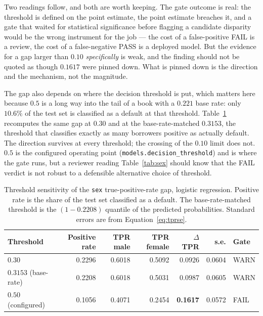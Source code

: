 \documentclass[10pt,a4paper]{article}
\newcommand{\code}[1]{\texttt{\small #1}}
\begin{document}
Two readings follow, and both are worth keeping. The gate outcome is real: the
threshold is defined on the point estimate, the point estimate breaches it, and a
gate that waited for statistical significance before flagging a candidate
disparity would be the wrong instrument for the job --- the cost of a
false-positive FAIL is a review, the cost of a false-negative PASS is a deployed
model. But the evidence for a gap larger than $0.10$ \emph{specifically} is weak,
and the finding should not be quoted as though $0.1617$ were pinned down. What is
pinned down is the direction and the mechanism, not the magnitude.

The gap also depends on where the decision threshold is put, which matters here
because $0.5$ is a long way into the tail of a book with a $0.221$ base rate: only
$10.6\%$ of the test set is classified as a default at that threshold.
Table~\ref{tab:thresholds} recomputes the same gap at $0.30$ and at the
base-rate-matched $0.3153$, the threshold that classifies exactly as many
borrowers positive as actually default. The direction survives at every threshold;
the crossing of the $0.10$ limit does not. $0.5$ is the configured operating point
(\code{models.decision\_threshold}) and is where the gate runs, but a reviewer
reading Table~\ref{tab:sex} should know that the FAIL verdict is not robust to a
defensible alternative choice of threshold.

\begin{table}[htbp]
\centering
\small
\caption{Threshold sensitivity of the \code{sex} true-positive-rate gap, logistic
regression. Positive rate is the share of the test set classified as a default.
The base-rate-matched threshold is the $(1 - 0.2208)$ quantile of the predicted
probabilities. Standard errors are from Equation~\ref{eq:tprse}.}
\label{tab:thresholds}
\setlength{\tabcolsep}{5pt}
\begin{tabular}{lrrrrrl}
\toprule
Threshold & Positive rate & TPR male & TPR female & $\Delta$TPR & s.e. & Gate \\
\midrule
$0.30$                  & 0.2296 & 0.6018 & 0.5092 & 0.0926 & 0.0604 & WARN \\
$0.3153$ (base-rate)    & 0.2208 & 0.6018 & 0.5031 & 0.0987 & 0.0605 & WARN \\
$0.50$ (configured)     & 0.1056 & 0.4071 & 0.2454 & \textbf{0.1617} & 0.0572 & FAIL \\
\bottomrule
\end{tabular}
\end{table}
\end{document}
